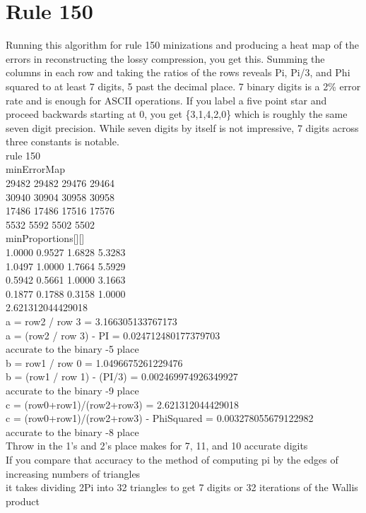 \documentclass[11pt]{article}
\begin{document}
\section{Rule 150}

Running this algorithm for rule 150 minizations and producing a heat map of the errors in reconstructing the lossy compression, you get this. Summing the columns in each row and taking the ratios of the rows reveals Pi, Pi/3, and Phi squared to at least 7 digits, 5 past the decimal place. 7 binary digits is a 2\% error rate and is enough for ASCII operations. If you label a five point star and proceed backwards starting at 0, you get \{3,1,4,2,0\} which is roughly the same seven digit precision. While seven digits by itself is not impressive, 7 digits across three constants is notable.\\

\noindent rule 150\\

\noindent minErrorMap\\
29482 29482 29476 29464 \\
30940 30904 30958 30958 \\
17486 17486 17516 17576 \\
5532 5592 5502 5502 \\

\noindent minProportions[][]\\
1.0000 0.9527 1.6828 5.3283 \\
1.0497 1.0000 1.7664 5.5929 \\
0.5942 0.5661 1.0000 3.1663 \\
0.1877 0.1788 0.3158 1.0000 \\
2.621312044429018\\

\noindent a = row2 / row 3 = 3.166305133767173\\
a = (row2 / row 3) - PI = 0.024712480177379703\\
accurate to the binary -5 place\\

\noindent b = row1 / row 0 = 1.0496675261229476\\
b = (row1 / row 1) - (PI/3) = 0.002469974926349927\\
accurate to the binary -9 place\\

\noindent c = (row0+row1)/(row2+row3) = 2.621312044429018\\
c = (row0+row1)/(row2+row3) - PhiSquared = 0.003278055679122982\\
accurate to the binary -8 place\\

\noindent Throw in the 1's and 2's place makes for 7, 11, and 10 accurate digits\\
If you compare that accuracy to the method of computing pi by the edges of increasing numbers of triangles\\
it takes dividing 2Pi into 32 triangles to get 7 digits or 32 iterations of the Wallis product\\



\end{document}

